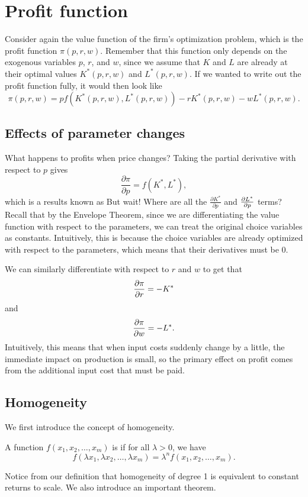 \section{Profit function}

Consider again the value function of the firm's optimization problem, which is the profit function $\pi(p, r, w)$. Remember that this function only depends on the exogenous variables $p$, $r$, and $w$, since we assume that $K$ and $L$ are already at their optimal values $K^*(p, r, w)$ and $L^*(p, r, w)$. If we wanted to write out the profit function fully, it would then look like
$$\pi(p, r, w) = pf(K^*(p, r, w), L^*(p, r, w)) - rK^*(p, r, w) - wL^*(p, r, w).$$

\subsection*{Effects of parameter changes}

What happens to profits when price changes? Taking the partial derivative with respect to $p$ gives
$$\frac{\partial \pi}{\partial p} = f(K^*, L^*),$$
which is a results known as  But wait! Where are all the $\frac{\partial K^*}{\partial p}$ and $\pdv{L^*}{p}$ terms? Recall that by the Envelope Theorem, since we are differentiating the value function with respect to the parameters, we can treat the original choice variables as constants. Intuitively, this is because the choice variables are already optimized with respect to the parameters, which means that their derivatives must be 0. 

We can similarly differentiate with respect to $r$ and $w$ to get that 
$$\pdv{\pi}{r} = -K^*$$
and
$$\pdv{\pi}{w} = -L^*.$$
Intuitively, this means that when input costs suddenly change by a little, the immediate impact on production is small, so the primary effect on profit comes from the additional input cost that must be paid.

\subsection*{Homogeneity}
We first introduce the concept of homogeneity.
\begin{definition*} \label{def:homogeneity}
A function $f(x_1, x_2, \ldots, x_m)$ is  if for all $\lambda > 0$, we have 
$$f\left(\lambda x_{1}, \lambda x_{2}, \ldots, \lambda x_{m}\right)=\lambda^{n} f\left(x_{1}, x_{2}, \ldots, x_{m}\right).$$
\end{definition*}
Notice from our definition that homogeneity of degree 1 is equivalent to constant returns to scale. We also introduce an important theorem.

